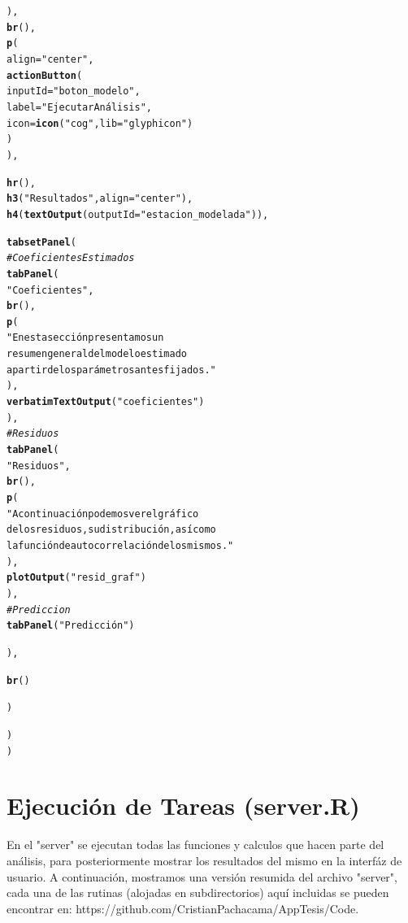 \documentclass[12pt,oneside]{book}\usepackage[]{graphicx}\usepackage[]{color}
\makeatletter
\newcommand{\hlstr}[1]{\textcolor[rgb]{0.192,0.494,0.8}{#1}}%
\newcommand{\hlcom}[1]{\textcolor[rgb]{0.678,0.584,0.686}{\textit{#1}}}%
\newcommand{\hlstd}[1]{\textcolor[rgb]{0.345,0.345,0.345}{#1}}%
\newcommand{\hlkwc}[1]{\textcolor[rgb]{0.333,0.667,0.333}{#1}}%
\newcommand{\hlkwd}[1]{\textcolor[rgb]{0.737,0.353,0.396}{\textbf{#1}}}%
\newenvironment{kframe}{%
 \def\at@end@of@kframe{}%
 \ifinner\ifhmode%
  \def\at@end@of@kframe{\end{minipage}}%
  \begin{minipage}{\columnwidth}%
 \fi\fi%
 \def\FrameCommand##1{\hskip\@totalleftmargin \hskip-\fboxsep
 \colorbox{shadecolor}{##1}\hskip-\fboxsep
     \hskip-\linewidth \hskip-\@totalleftmargin \hskip\columnwidth}%
 \MakeFramed {\advance\hsize-\width
   \@totalleftmargin\z@ \linewidth\hsize
   \@setminipage}}%
 {\par\unskip\endMakeFramed%
 \at@end@of@kframe}
\newenvironment{knitrout}{}{} %
\theoremstyle{definition} %
\makeatother
\begin{document}
\begin{knitrout}
\begin{kframe}
\begin{alltt}
    \hlstd{),}
    \hlkwd{br}\hlstd{(),}
    \hlkwd{p}\hlstd{(}
      \hlkwc{align} \hlstd{=} \hlstr{"center"}\hlstd{,}
      \hlkwd{actionButton}\hlstd{(}
        \hlkwc{inputId} \hlstd{=} \hlstr{"boton_modelo"}\hlstd{,}
        \hlkwc{label} \hlstd{=} \hlstr{"Ejecutar Análisis"}\hlstd{,}
        \hlkwc{icon} \hlstd{=} \hlkwd{icon}\hlstd{(}\hlstr{"cog"}\hlstd{,} \hlkwc{lib} \hlstd{=} \hlstr{"glyphicon"}\hlstd{)}
      \hlstd{)}
    \hlstd{),}

    \hlkwd{hr}\hlstd{(),}
    \hlkwd{h3}\hlstd{(}\hlstr{"Resultados"}\hlstd{,} \hlkwc{align} \hlstd{=} \hlstr{"center"}\hlstd{),}
    \hlkwd{h4}\hlstd{(}\hlkwd{textOutput}\hlstd{(}\hlkwc{outputId} \hlstd{=} \hlstr{"estacion_modelada"}\hlstd{)),}

    \hlkwd{tabsetPanel}\hlstd{(}
      \hlcom{#Coeficientes Estimados}
      \hlkwd{tabPanel}\hlstd{(}
        \hlstr{"Coeficientes"}\hlstd{,}
        \hlkwd{br}\hlstd{(),}
        \hlkwd{p}\hlstd{(}
          \hlstr{"En esta sección presentamos un
          resumen general del modelo estimado
          a partir de los parámetros antes fijados."}
        \hlstd{),}
        \hlkwd{verbatimTextOutput}\hlstd{(}\hlstr{"coeficientes"}\hlstd{)}
        \hlstd{),}
      \hlcom{#Residuos}
      \hlkwd{tabPanel}\hlstd{(}
        \hlstr{"Residuos"}\hlstd{,}
        \hlkwd{br}\hlstd{(),}
        \hlkwd{p}\hlstd{(}
          \hlstr{"A continuación podemos ver el gráfico
          de los residuos, su distribución, así como
          la función de autocorrelación de los mismos."}
        \hlstd{),}
        \hlkwd{plotOutput}\hlstd{(}\hlstr{"resid_graf"}\hlstd{)}
        \hlstd{),}
      \hlcom{#Prediccion}
      \hlkwd{tabPanel}\hlstd{(}\hlstr{"Predicción"}\hlstd{)}



      \hlstd{),}

    \hlkwd{br}\hlstd{()}


      \hlstd{)}

    \hlstd{)}
    \hlstd{)}
\end{alltt}
\end{kframe}
\end{knitrout}



\section{Ejecución de Tareas (server.R)}

En el "server" se ejecutan todas las funciones y calculos que hacen parte del análisis, para posteriormente mostrar los resultados del mismo en la interfáz de usuario. A continuación, mostramos una versión resumida del archivo "server", cada una de las rutinas (alojadas en subdirectorios) aquí incluidas se pueden encontrar en: {\color{blue} https://github.com/CristianPachacama/AppTesis/Code}.
\end{document}
